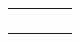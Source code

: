 \begin{table}[]
\begin{tabular}{|l|l|l|l|}
		&                                                                    &                                                         &                                                                                                                                                                   \\ \hline
		&                                                                    &                                                         &                                                                                                                                                                   \\ \hline
		&                                                                    &                                                         &                                                                                                                                                                   \\ \hline
		&                                                                    &                                                         &                                                                                                                                                                   \\ \hline
		&                                                                    &                                                         &                                                                                                                                                                   \\ \hline
	\end{tabular}
\end{table}




